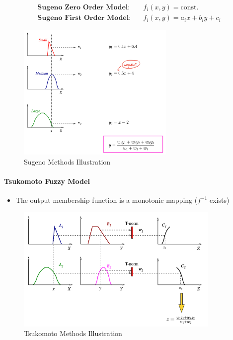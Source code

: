 \documentclass{tron}
\begin{document}
\begin{align}
	\textbf{Sugeno Zero Order Model:} \quad & f_i(x,y) = \text{const.} \\
	\textbf{Sugeno First Order Model:} \quad & f_i(x,y) = a_i x + b_i y + c_i
\end{align}

\begin{figure}[H]
	\centering
	\includegraphics[height=250px]{Figs/FuzzyInferencing/Sugeno}
	\caption{Sugeno Methods Illustration}
	\label{fig:fuzzy-inf:sugeno}
\end{figure}

\paragraph{Tsukomoto Fuzzy Model}
\begin{itemize}
	\item The output membership function is a monotonic mapping ($f^{-1}$ exists)
\end{itemize}

\begin{figure}[H]
	\centering
	\includegraphics[height=230px]{Figs/FuzzyInferencing/tsukomoto}
	\caption{Tsukomoto Methods Illustration}
	\label{fig:fuzzy-inf:tsukomoto}
\end{figure}
\end{document}
